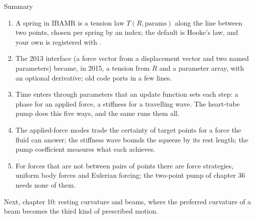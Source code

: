 \documentclass[aspectratio=169,11pt]{beamer}
\begin{document}
\begin{frame}{Summary}
\label{fr:summary}
\footnotesize
\begin{enumerate}
  \item A spring in IBAMR is a tension law $T(R, \mathrm{params})$ along the line between two points, chosen per spring by an index; the default is Hooke's law, and your own is registered with .
  \item The 2013 interface (a force vector from a displacement vector and two named parameters) became, in 2015, a tension from $R$ and a parameter array, with an optional derivative; old code ports in a few lines.
  \item Time enters through parameters that an update function sets each step: a phase for an applied force, a stiffness for a travelling wave. The heart-tube pump does this five ways, and the same  runs them all.
  \item The applied-force modes trade the certainty of target points for a force the fluid can answer; the stiffness wave bounds the squeeze by its rest length; the pump coefficient measures what each achieves.
  \item For forces that are not between pairs of points there are force strategies, uniform body forces and Eulerian forcing; the two-point pump of chapter 36 needs none of them.
\end{enumerate}
\begin{homebox}
\footnotesize Next, chapter 10: resting curvature and beams, where the preferred curvature of a beam becomes the third kind of prescribed motion.
\end{homebox}
\end{frame}
\end{document}
